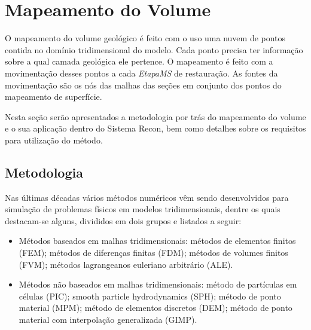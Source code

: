
\section{Mapeamento do Volume}

O mapeamento do volume geológico é feito com o uso uma nuvem de pontos contida no domínio tridimensional do modelo. Cada ponto precisa ter informação sobre a qual camada geológica ele pertence. O mapeamento é feito com a movimentação desses pontos a cada \textit{EtapaMS} de restauração. As fontes da movimentação são os nós das malhas das seções em conjunto dos pontos do mapeamento de superfície.

Nesta seção serão apresentados a metodologia por trás do mapeamento do volume e o sua aplicação dentro do Sistema Recon, bem como detalhes sobre os requisitos para utilização do método.

\subsection{Metodologia}

Nas últimas décadas vários métodos numéricos vêm sendo desenvolvidos para simulação de problemas físicos em modelos tridimensionais, dentre os quais destacam-se alguns, divididos em dois grupos e listados a seguir:

\renewcommand{\labelitemi}{•}
\begin{itemize}
  \item Métodos baseados em malhas tridimensionais: métodos de elementos finitos (FEM)\cite{MEF}; métodos de diferenças finitas (FDM)\cite{MDF}; métodos de volumes finitos (FVM)\cite{MVF}; métodos lagrangeanos euleriano arbitrário (ALE)\cite{ALE}.
  \item Métodos não baseados em malhas tridimensionais: método de partículas em células (PIC)\cite{PIC}; smooth particle hydrodynamics (SPH)\cite{SPH}; método de ponto material (MPM)\cite{MPM}; método de elementos discretos (DEM)\cite{DEM}; método de ponto material com interpolação generalizada (GIMP)\cite{GIMP,MullerGIMP}.
\end{itemize}

